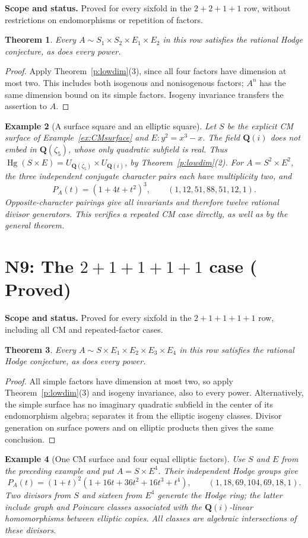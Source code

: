 \documentclass[10pt,reqno]{article}
\theoremstyle{emphasizedplain}
\DeclareRobustCommand{\provedstatus}{%
  \texorpdfstring{\textcolor{ProvedGreen}{\textbf{Proved}}}{Proved}}
\newtheorem{theorem}{Theorem}[section]
\theoremstyle{emphasizeddefinition}
\newtheorem{example}[theorem]{Example}
\theoremstyle{emphasizeddefinition}
\DeclareMathOperator{\Hg}{Hg}
\newcommand{\Q}{\mathbf Q}
\newcommand{\status}[1]{%
  \par\nobreak\smallskip\noindent
  {\setlength{\fboxsep}{7pt}%
   \colorbox{ScopeBackground}{%
    \parbox{\dimexpr\linewidth-2\fboxsep\relax}{%
     \small\textbf{\textcolor{HeadingInk}{Scope and status.}} #1}}}%
  \par\nobreak\medskip}
\renewcommand{\small}{\fontsize{8.4}{10}\selectfont}
\begin{document}
\status{Proved for every sixfold in the $2+2+1+1$ row, without
restrictions on endomorphisms or repetition of factors.}
\begin{theorem}
Every $A\sim S_1\times S_2\times E_1\times E_2$ in this row satisfies
the rational Hodge conjecture, as does every power.
\end{theorem}
\begin{proof}
Apply Theorem~\ref{p:lowdim}(3), since all four factors have dimension
at most two. This includes both isogenous and nonisogenous factors;
$A^n$ has the same dimension bound on its simple factors. Isogeny
invariance transfers the assertion to $A$.
\end{proof}
\begin{example}[A surface square and an elliptic square]
Let $S$ be the explicit CM surface of Example~\ref{ex:CMsurface} and
$E:y^2=x^3-x$. The field $\Q(i)$ does not embed in $\Q(\zeta_5)$,
whose only quadratic subfield is real. Thus
$\Hg(S\times E)=U_{\Q(\zeta_5)}\times U_{\Q(i)}$, by
Theorem~\ref{p:lowdim}(2). For $A=S^2\times E^2$, the three independent
conjugate character pairs each have multiplicity two, and
\[
 P_A(t)=(1+4t+t^2)^3,
 \qquad (1,12,51,88,51,12,1).
\]
Opposite-character pairings give all invariants and therefore twelve
rational divisor generators. This verifies a repeated CM case directly,
as well as by the general theorem.
\end{example}
\section{N9: The \texorpdfstring{$2+1+1+1+1$}{2+1+1+1+1} case (\provedstatus)}\label{sec:N9}

\status{Proved for every sixfold in the $2+1+1+1+1$ row, including
all CM and repeated-factor cases.}
\begin{theorem}
Every $A\sim S\times E_1\times E_2\times E_3\times E_4$ in this row
satisfies the rational Hodge conjecture, as does every power.
\end{theorem}
\begin{proof}
All simple factors have dimension at most two, so apply
Theorem~\ref{p:lowdim}(3) and isogeny invariance, also to every power.
Alternatively, the simple surface has no imaginary quadratic subfield
in the center of its endomorphism algebra; \cite[Proposition (3.8)]{MZ}
separates it from the elliptic isogeny classes. Divisor generation on
surface powers and on elliptic products then gives the same conclusion.
\end{proof}
\begin{example}[One CM surface and four equal elliptic factors]
Use $S$ and $E$ from the preceding example and put $A=S\times E^4$.
Their independent Hodge groups give
\[
 P_A(t)=(1+t)^2(1+16t+36t^2+16t^3+t^4),
 \qquad (1,18,69,104,69,18,1).
\]
Two divisors from $S$ and sixteen from $E^4$ generate the Hodge ring;
the latter include graph and Poincare classes associated with the
$\Q(i)$-linear homomorphisms between elliptic copies.
All classes are algebraic intersections of these divisors.
\end{example}
\end{document}
